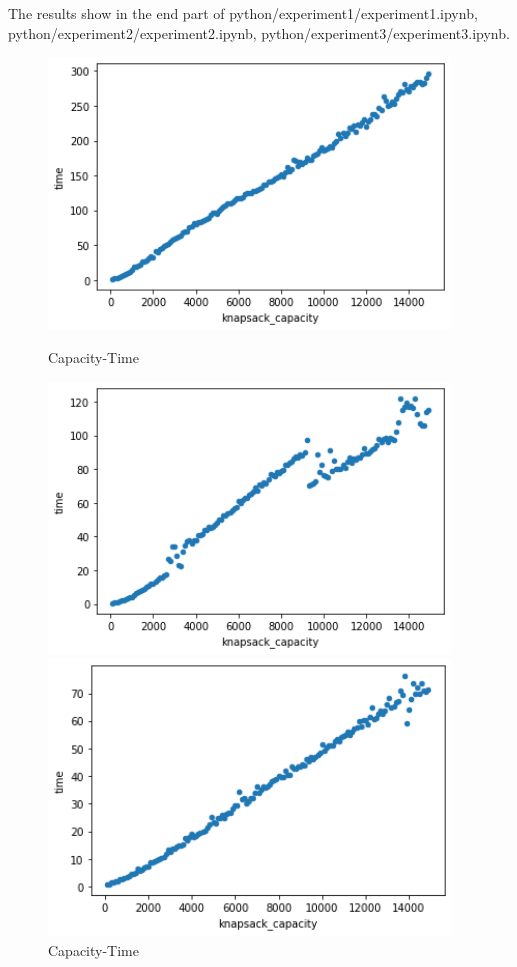 \documentclass[a4]{article}
\begin{document}
\noindent The results show in the end part of python/experiment1/experiment1.ipynb, python/experiment2/experiment2.ipynb, python/experiment3/experiment3.ipynb.

\begin{figure}[H]
    \begin{minipage}{0.32\textwidth}        
    \includegraphics[width=0.95\textwidth]{python/experiment1/output1.png}
    \caption{Capacity-Time}
    \end{minipage}
    \begin{minipage}{0.32\textwidth}        
    \includegraphics[width=0.95\textwidth]{python/experiment2/output2.png}
    \caption{Capacity-Time}
    \end{minipage}
    \begin{minipage}{0.32\textwidth}        
    \includegraphics[width=0.95\textwidth]{python/experiment3/output3.png}

\end{minipage}
\end{figure}
\end{document}

